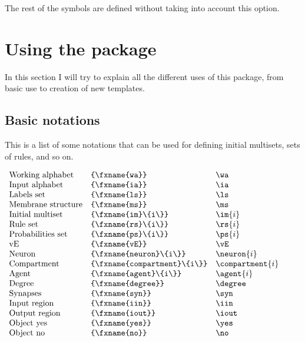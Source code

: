 \documentclass{article}
\begin{document}
The rest of the symbols are defined without taking into account this option.

\section{Using the package}
\label{sec:using-package}

In this section I will try to explain all the different uses of this
package, from basic use to creation of new templates.

\subsection{Basic notations}
\label{sec:basic-notations}

This is a list of some notations that can be used for defining initial
multisets, sets of rules, and so on.

\vspace{1mm}

$
\begin{array}{lll}
  \mbox{Working alphabet} & \verb=\wa= & \wa \\
  \mbox{Input alphabet} & \verb=\ia= & \ia \\
  \mbox{Labels set} & \verb=\ls= & \ls \\
  \mbox{Membrane structure} & \verb=\ms= & \ms \\
  \mbox{Initial multiset} & \verb=\im{i}= & \im{i} \\
  \mbox{Rule set} & \verb=\rs{i}= & \rs{i} \\
  \mbox{Probabilities set} & \verb=\ps{i}= & \ps{i} \\
  \mbox{vE} & \verb=\vE= & \vE \\
  \mbox{Neuron} & \verb=\neuron{i}= & \neuron{i} \\
  \mbox{Compartment} & \verb=\compartment{i}= & \compartment{i} \\
  \mbox{Agent} & \verb=\agent{i}= & \agent{i} \\
  \mbox{Degree} & \verb=\degree= & \degree \\
  \mbox{Synapses} & \verb=\syn= & \syn \\
  \mbox{Input region} & \verb=\iin= & \iin \\
  \mbox{Output region} & \verb=\iout= & \iout \\
  \mbox{Object yes} & \verb=\yes= & \yes \\
  \mbox{Object no} & \verb=\no= & \no \\
\end{array}
$
\end{document}
